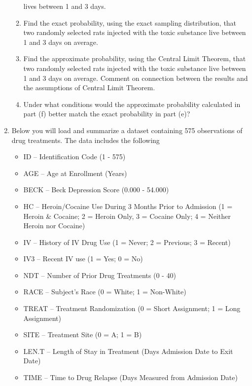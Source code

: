 \documentclass{article}\usepackage[]{graphicx}\usepackage[]{color}
\begin{document}
\begin{enumerate}
\begin{enumerate}
	  lives between 1 and 3 days.
	  \item Find the exact probability, using the exact sampling distribution, that two randomly selected rats injected with the toxic substance live  between 1 and 3 days on average.
  \item Find the approximate probability, using the Central Limit Theorem, that two randomly 
	  selected rats injected with the toxic substance live between 1 and 3 days on average. Comment
	  on connection between the results and the assumptions of Central Limit Theorem.
\item Under what conditions would the approximate probability calculated in 
part (f) better match the exact probability in part (e)?
  \end{enumerate}
\newpage
\item Below you will load and summarize a dataset 
  containing 575 observations of drug treatments. The data includes the following
  \begin{itemize}
    \item ID --	Identification Code	(1 - 575)
    \item AGE	-- Age at Enrollment	(Years)
    \item BECK -- Beck Depression Score	(0.000 - 54.000)
    \item HC --	Heroin/Cocaine Use During	3 Months Prior to Admission (1 = Heroin
    \& Cocaine; 2 = Heroin Only, 3 = Cocaine Only; 4 = Neither Heroin nor Cocaine)
    \item IV -- History of IV Drug Use	(1 = Never; 2 = Previous; 3 = Recent)
    \item IV3	-- Recent IV use	(1 = Yes; 0 = No)
    \item NDT -- Number of Prior Drug Treatments (0 - 40)
    \item RACE -- Subject's Race	(0 = White; 1 = Non-White)
\item TREAT -- Treatment Randomization (0 = Short Assignment;	1 = Long Assignment)
\item SITE -- Treatment Site (0 = A; 1 = B)
\item LEN.T	-- Length of Stay in Treatment (Days Admission Date to Exit Date)	
\item TIME -- Time to Drug Relapse (Days Measured from Admission Date)

\end{itemize}
\end{enumerate}
\end{document}
